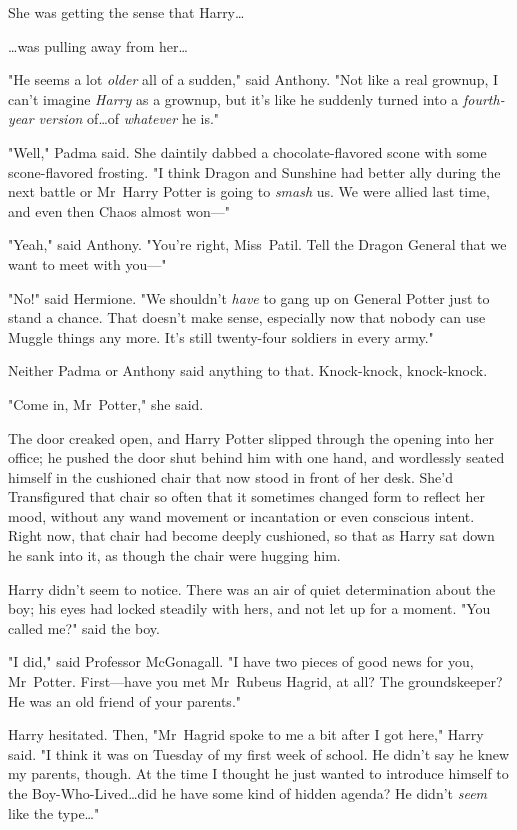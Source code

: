 She was getting the sense that Harry…

…was pulling away from her…

"He seems a lot \emph{older} all of a sudden," said Anthony. "Not like a real
grownup, I can’t imagine \emph{Harry} as a grownup, but it’s like he suddenly
turned into a \emph{fourth-year version} of…of \emph{whatever} he is."

"Well," Padma said. She daintily dabbed a chocolate-flavored scone with some
scone-flavored frosting. "I think Dragon and Sunshine had better ally during
the next battle or Mr~Harry Potter is going to \emph{smash} us. We were allied
last time, and even then Chaos almost won—"

"Yeah," said Anthony. "You’re right, Miss~Patil. Tell the Dragon General that
we want to meet with you—"

"No!" said Hermione. "We shouldn’t \emph{have} to gang up on General Potter
just to stand a chance. That doesn’t make sense, especially now that nobody can
use Muggle things any more. It’s still twenty-four soldiers in every army."

Neither Padma or Anthony said anything to that.
\later
Knock-knock, knock-knock.

"Come in, Mr~Potter," she said.

The door creaked open, and Harry Potter slipped through the opening into her
office; he pushed the door shut behind him with one hand, and wordlessly seated
himself in the cushioned chair that now stood in front of her desk. She’d
Transfigured that chair so often that it sometimes changed form to reflect her
mood, without any wand movement or incantation or even conscious intent. Right
now, that chair had become deeply cushioned, so that as Harry sat down he sank
into it, as though the chair were hugging him.

Harry didn’t seem to notice. There was an air of quiet determination about the
boy; his eyes had locked steadily with hers, and not let up for a moment. "You
called me?" said the boy.

"I did," said Professor McGonagall. "I have two pieces of good news for you,
Mr~Potter. First—have you met Mr~Rubeus Hagrid, at all? The groundskeeper?
He was an old friend of your parents."

Harry hesitated. Then, "Mr~Hagrid spoke to me a bit after I got here," Harry
said. "I think it was on Tuesday of my first week of school. He didn’t say he
knew my parents, though. At the time I thought he just wanted to introduce
himself to the Boy-Who-Lived…did he have some kind of hidden agenda? He
didn’t \emph{seem} like the type…"

